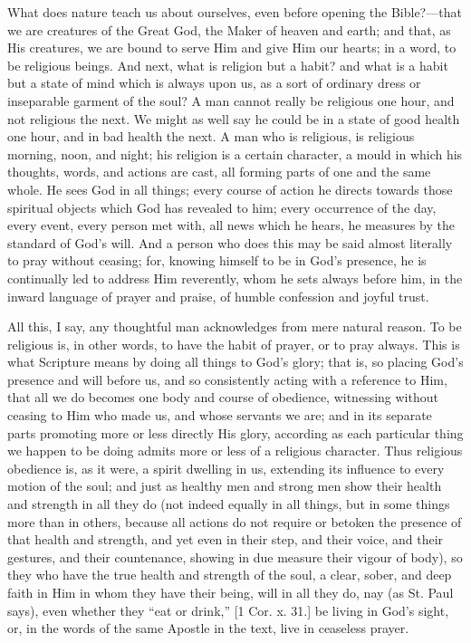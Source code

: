 What does nature teach us about ourselves, even before opening the
Bible?—that we are creatures of the Great God, the Maker of heaven
and earth; and that, as His creatures, we are bound to serve Him and
give Him our hearts; in a word, to be religious beings. And next, what
is religion but a habit? and what is a habit but a state of mind which
is always upon us, as a sort of ordinary dress or inseparable garment
of the soul? A man cannot really be religious one hour, and not
religious the next. We might as well say he could be in a state of
good health one hour, and in bad health the next. A man who is
religious, is religious morning, noon, and night; his religion is a
certain character, a mould in which his thoughts, words, and actions
are cast, all forming parts of one and the same whole. He sees God in
all things; every course of action he directs towards those spiritual
objects which God has revealed to him; every occurrence of the day,
every event, every person met with, all news which he hears, he
measures by the standard of God's will. And a person who does this may
be said almost literally to pray without ceasing; for, knowing himself
to be in God's presence, he is continually led to address Him
reverently, whom he sets always before him, in the inward language of
prayer and praise, of humble confession and joyful trust.

All this, I say, any thoughtful man acknowledges from mere natural
reason. To be religious is, in other words, to have the habit of
prayer, or to pray always. This is what Scripture means by doing all
things to God's glory; that is, so placing God's presence and will
before us, and so consistently acting with a reference to Him, that
all we do becomes one body and course of obedience, witnessing without
ceasing to Him who made us, and whose servants we are; and in its
separate parts promoting more or less directly His glory, according as
each particular thing we happen to be doing admits more or less of a
religious character. Thus religious obedience is, as it were, a spirit
dwelling in us, extending its influence to every motion of the soul;
and just as healthy men and strong men show their health and strength
in all they do (not indeed equally in all things, but in some things
more than in others, because all actions do not require or betoken the
presence of that health and strength, and yet even in their step, and
their voice, and their gestures, and their countenance, showing in due
measure their vigour of body), so they who have the true health and
strength of the soul, a clear, sober, and deep faith in Him in whom
they have their being, will in all they do, nay (as St. Paul says),
even whether they ``eat or drink,'' [1 Cor. x. 31.] be living
in God's sight, or, in the words of the same Apostle in the text, live
in ceaseless prayer.

